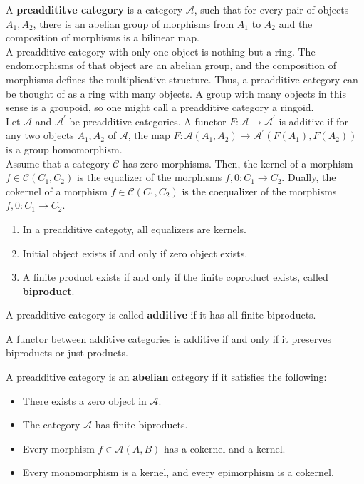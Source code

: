 A \textbf{preaddititve category} is a category $\mathcal{A}$, such that for every pair of objects $A_1, A_2$, there is an abelian group of morphisms from $A_1$ to $A_2$ and the composition of morphisms is a bilinear map.\\
A preadditive category with only one object is nothing but a ring. The endomorphisms of that object are an abelian group, and the composition of morphisms defines the multiplicative structure. Thus, a preadditive category can be thought of as a ring with many objects. A group with many objects in this sense is a groupoid, so one might call a preadditive category a ringoid.\\
Let $\mathcal{A}$ and $\mathcal{A}^{\prime}$ be preadditive categories. A functor $F: \mathcal{A} \rightarrow \mathcal{A}^{\prime}$ is additive if for any two objects $A_1, A_2$ of $\mathcal{A}$, the map $F: \mathcal{A}\left(A_1, A_2\right) \rightarrow \mathcal{A}^{\prime}\left(F\left(A_1\right), F\left(A_2\right)\right)$ is a group homomorphism.\\

Assume that a category $\mathcal{C}$ has zero morphisms. Then, the kernel of a morphism $f \in \mathcal{C}\left(C_1, C_2\right)$ is the equalizer of the morphisms $f, 0: C_1 \rightarrow C_2$. Dually, the cokernel of a morphism $f \in \mathcal{C}\left(C_1, C_2\right)$ is the coequalizer of the morphisms $f, 0: C_1 \rightarrow C_2$.

\begin{prop}
    \begin{enumerate}
        \item In a preadditive categoty, all equalizers are kernels.
        \item Initial object exists if and only if zero object exists.
        \item A finite product exists if and only if the finite coproduct exists, called \textbf{biproduct}.
    \end{enumerate}
\end{prop}

A preadditive category is called \textbf{additive} if it has all finite biproducts.\\

\begin{prop}
A functor between additive categories is additive if and only if it preserves biproducts or just products.
\end{prop}

A preadditive category is an \textbf{abelian} category if it satisfies the following: 
\begin{itemize}
    \item There exists a zero object in $\mathcal{A}$.
    \item The category $\mathcal{A}$ has finite biproducts.
    \item Every morphism $f \in \mathcal{A}(A, B)$ has a cokernel and a kernel.
    \item Every monomorphism is a kernel, and every epimorphism is a cokernel.
\end{itemize}

